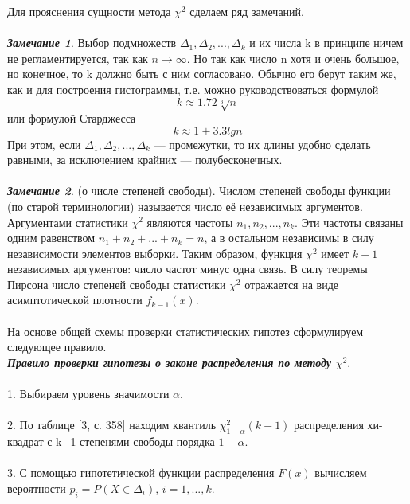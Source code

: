 \documentclass{article}
\begin{document}
Для прояснения сущности метода $\chi^{2}$ сделаем ряд замечаний.
\\\\
\textbf{\textit{Замечание 1}}. Выбор подмножеств $\Delta_{1},\Delta_{2}, ... ,\Delta_{k}$ и их числа k в принципе ничем не регламентируется, так как $n \rightarrow \infty$. Но так как число n хотя и очень большое, но конечное, то k должно быть с ним согласовано. Обычно его берут таким же, как и для построения гистограммы, т.е. можно руководствоваться формулой
\begin{equation}
k \approx 1.72\sqrt[3]{n}
\label{k_1}
\end{equation}
или формулой Старджесса
\begin{equation}
k \approx 1 + 3.3lgn
\end{equation}
При этом, если  $\Delta_{1},\Delta_{2}, ... ,\Delta_{k}$ — промежутки, то их длины удобно сделать равными, за исключением крайних — полубесконечных.
\\\\
\textbf{\textit{Замечание 2}}. (о числе степеней свободы).
Числом степеней свободы функции (по старой терминологии) называется число её независимых аргументов. Аргументами статистики $\chi^{2}$ являются частоты $n_{1},n_{2}, ... ,n_{k}$. Эти частоты связаны одним равенством $n_{1} + n_{2} + ... + n_{k}  = n$, а в остальном независимы в силу независимости элементов выборки. Таким образом, функция $\chi^{2}$  имеет $k-1$ независимых аргументов: число частот минус одна связь. В силу теоремы Пирсона число степеней свободы статистики $\chi^{2}$  отражается на виде асимптотической плотности $f_{k - 1}(x)$.
\\\\
На основе общей схемы проверки статистических гипотез сформулируем следующее правило.
\\
\textbf{\textit{Правило проверки гипотезы о законе распределения по методу $\chi^{2}$}}.
\\\\
1. Выбираем уровень значимости $\alpha$.
\\\\
2. По таблице [3, с. 358] находим квантиль $\chi^{2}_{1-\alpha}(k - 1)$ распределения хи-квадрат с k$-$1 степенями свободы порядка $1-\alpha$. 
\\\\
3. С помощью гипотетической функции распределения $F(x)$ вычисляем вероятности $p_{i} = P (X \in \Delta_{i})$, $i = 1, ... ,k$.
\\\\
\end{document}
